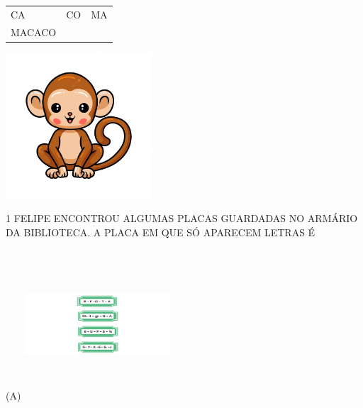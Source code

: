 \begin{longtable}[]{@{}lll@{}}
\toprule
CA & CO & MA\tabularnewline
MACACO\tabularnewline
\bottomrule
\end{longtable}

\includegraphics[width=2.14688in,height=2.14688in]{media/image81.png}







\num{1} FELIPE ENCONTROU ALGUMAS PLACAS GUARDADAS NO ARMÁRIO DA BIBLIOTECA. A
PLACA EM QUE SÓ APARECEM LETRAS É

(A)
\includegraphics[width=2.16042in,height=2.19514in]{media/image82.png}

